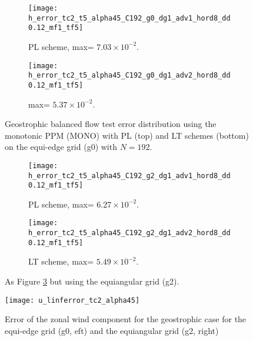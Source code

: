 \begin{figure}[!h]
	\centering
	\begin{subfigure}{0.6\textwidth}
		\centering
		\texttt{[image: h\_error\_tc2\_t5\_alpha45\_C192\_g0\_dg1\_adv1\_hord8\_dd0.12\_mf1\_tf5]}
		\caption{PL scheme, max= $7.03\times10^{-2}$.\label{chp-advcs-sec-exp-sw1-errors-0a}}
	\end{subfigure}
	\begin{subfigure}{0.6\textwidth}
		\centering
		\texttt{[image: h\_error\_tc2\_t5\_alpha45\_C192\_g0\_dg1\_adv2\_hord8\_dd0.12\_mf1\_tf5]}
		\caption{ max= $5.37\times10^{-2}$.\label{chp-advcs-sec-exp-sw1-errors-0b}}
	\end{subfigure}
	\caption{
		Geostrophic balanced flow test error distribution using the monotonic PPM (MONO)
		with PL (top) and LT schemes (bottom) on the equi-edge grid (g0) with $N=192$. 
		\label{chp-advcs-sec-exp-sw1-errors-0}}
\end{figure}
\newpage
\begin{figure}[!h]
	\centering
	\begin{subfigure}{0.6\textwidth}
		\centering
		\texttt{[image: h\_error\_tc2\_t5\_alpha45\_C192\_g2\_dg1\_adv1\_hord8\_dd0.12\_mf1\_tf5]}
		\caption{PL scheme,  max= $6.27\times10^{-2}$.\label{chp-advcs-sec-exp-sw1-errors-2a}}
	\end{subfigure}
	\begin{subfigure}{0.6\textwidth}
		\centering
		\texttt{[image: h\_error\_tc2\_t5\_alpha45\_C192\_g2\_dg1\_adv2\_hord8\_dd0.12\_mf1\_tf5]}
		\caption{LT scheme, max= $5.49\times10^{-2}$.\label{chp-advcs-sec-exp-sw1-errors-2b}}
	\end{subfigure}
	\caption{As Figure \ref{chp-advcs-sec-exp-sw1-errors-0} but using the equiangular grid (g2).\label{chp-advcs-sec-exp-sw1-errors-2}}
\end{figure}

\begin{figure}[!htb]
	\centering
	\texttt{[image: u\_linferror\_tc2\_alpha45]}
	\caption{Error of the zonal wind component for the geostrophic case for the equi-edge grid (g0, eft) and the equiangular grid (g2, right) \label{chp-advcs-sec-exp-sw-l2}}
\end{figure}


